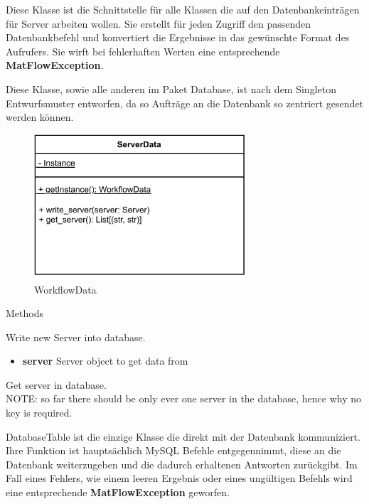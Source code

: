Diese Klasse ist die Schnittstelle für alle Klassen die auf den Datenbankeinträgen für Server arbeiten wollen. Sie erstellt für jeden Zugriff den passenden Datenbankbefehl und konvertiert die Ergebnisse in das gewünschte Format des Aufrufers.
Sie wirft bei fehlerhaften Werten eine entsprechende \textbf{MatFlowException}.

Diese Klasse, sowie alle anderen im Paket Database, ist nach dem Singleton Entwurfsmuster entworfen, da so Aufträge an die Datenbank so zentriert gesendet werden können.
\begin{figure}[h]
	\centering
	\includegraphics[width=0.7\textwidth]{res/Klassen/ServerData.pdf} 
	\caption{WorkflowData}
	\label{fig:workflowDataClass}
\end{figure}

\begin{methodenv}{Methods}
	
Write new Server into database.

\begin{itemize}
	\item \textbf{server} 
	Server object to get data from
\end{itemize}

Get server in database.\\
NOTE: so far there should be only ever one server in the database, hence why no key is required.

\end{methodenv}

DatabaseTable ist die einzige Klasse die direkt mit der Datenbank kommuniziert. Ihre Funktion ist hauptsächlich MySQL Befehle entgegennimmt, diese an die Datenbank weiterzugeben und die dadurch erhaltenen Antworten zurückgibt. Im Fall eines Fehlers, wie einem leeren Ergebnis oder eines ungültigen Befehls wird eine entsprechende \textbf{MatFlowException} geworfen.

